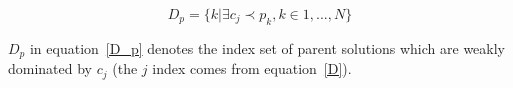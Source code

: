 \documentclass{IEEEtran}
\begin{document}
\begin{equation}
\label{D_p}
D_p = \{k| \exists c_j \prec p_k, k \in {1,..., N}\}
\end{equation}

$D_p$ in equation~\ref{D_p} denotes the index set of parent solutions which are weakly dominated by $c_j$ (the $j$ index comes from equation~\ref{D}).










\end{document}
